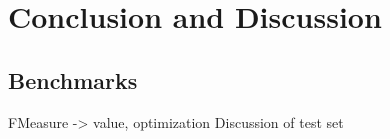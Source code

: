 %
\section{Conclusion and Discussion}
\label{sec_conclusion}

\subsection{Benchmarks}
FMeasure -> value, optimization
Discussion of test set